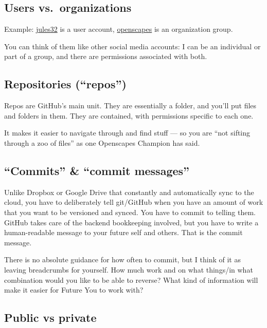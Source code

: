 \documentclass[
  letterpaper,
  DIV=11,
  numbers=noendperiod]{scrreprt}
\begin{document}
\hypertarget{users-vs.-organizations}{%
\subsection{Users vs.~organizations}\label{users-vs.-organizations}}

Example: \href{https://github.com/jules32}{jules32} is a user account,
\href{https://github.com/openscapes}{openscapes} is an organization
group.

You can think of them like other social media accounts: I can be an
individual or part of a group, and there are permissions associated with
both.

\hypertarget{repositories-repos}{%
\subsection{Repositories (``repos'')}\label{repositories-repos}}

Repos are GitHub's main unit. They are essentially a folder, and you'll
put files and folders in them. They are contained, with permissions
specific to each one.

It makes it easier to navigate through and find stuff --- so you are
``not sifting through a zoo of files'' as one Openscapes Champion has
said.

\hypertarget{commits-commit-messages}{%
\subsection{``Commits'' \& ``commit
messages''}\label{commits-commit-messages}}

Unlike Dropbox or Google Drive that constantly and automatically sync to
the cloud, you have to deliberately tell git/GitHub when you have an
amount of work that you want to be versioned and synced. You have to
commit to telling them. GitHub takes care of the backend bookkeeping
involved, but you have to write a human-readable message to your future
self and others. That is the commit message.

There is no absolute guidance for how often to commit, but I think of it
as leaving breadcrumbs for yourself. How much work and on what things/in
what combination would you like to be able to reverse? What kind of
information will make it easier for Future You to work with?

\hypertarget{public-vs-private}{%
\subsection{Public vs private}\label{public-vs-private}}
\end{document}
